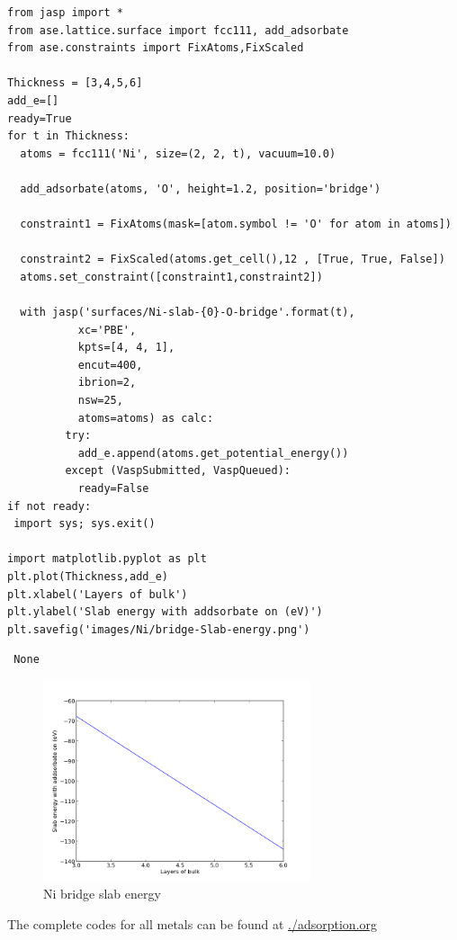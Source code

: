 \documentclass[11pt]{article}
\begin{document}
\begin{verbatim}
from jasp import *
from ase.lattice.surface import fcc111, add_adsorbate
from ase.constraints import FixAtoms,FixScaled

Thickness = [3,4,5,6]
add_e=[]
ready=True
for t in Thickness:
  atoms = fcc111('Ni', size=(2, 2, t), vacuum=10.0)

  add_adsorbate(atoms, 'O', height=1.2, position='bridge')

  constraint1 = FixAtoms(mask=[atom.symbol != 'O' for atom in atoms])

  constraint2 = FixScaled(atoms.get_cell(),12 , [True, True, False])
  atoms.set_constraint([constraint1,constraint2])

  with jasp('surfaces/Ni-slab-{0}-O-bridge'.format(t),
           xc='PBE',
           kpts=[4, 4, 1],
           encut=400,
           ibrion=2,
           nsw=25,
           atoms=atoms) as calc:
         try:
           add_e.append(atoms.get_potential_energy())
         except (VaspSubmitted, VaspQueued):
           ready=False
if not ready:
 import sys; sys.exit()

import matplotlib.pyplot as plt
plt.plot(Thickness,add_e)
plt.xlabel('Layers of bulk')
plt.ylabel('Slab energy with addsorbate on (eV)')
plt.savefig('images/Ni/bridge-Slab-energy.png')
\end{verbatim}
\begin{verbatim}
 None
\end{verbatim}
\begin{figure}[H]
\centering
\includegraphics[width=0.7\textwidth]{./images/Ni/bridge-Slab-energy.png}
\caption{Ni bridge slab energy}
\end{figure}

The complete codes for all metals can be found at \href{file://../adsorption.org}{./adsorption.org}
\end{document}
